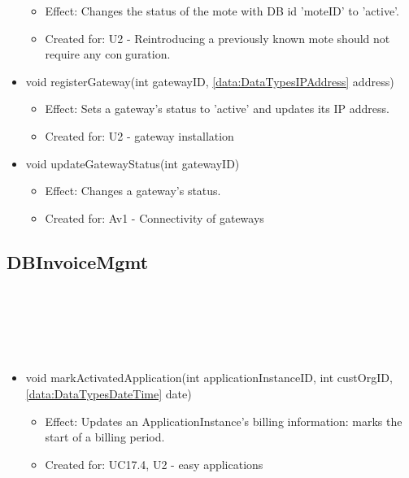 \begin{description}
\begin{itemize}[noitemsep,nolistsep,leftmargin=-.25cm]
\begin{itemize}[noitemsep,nolistsep]
           \item Effect: Changes the status of the mote with DB id 'moteID' to 'active'.
\item Created for: U2 - Reintroducing a previously known mote should not require any conguration.
        \end{itemize}
      \item \textsf{void registerGateway(int gatewayID, \ref{data:DataTypesIPAddress} address)}
        \begin{itemize}[noitemsep,nolistsep]
           \item Effect: Sets a gateway's status to 'active' and updates its IP address.
\item Created for: U2 - gateway installation
        \end{itemize}
      \item \textsf{void updateGatewayStatus(int gatewayID)}
        \begin{itemize}[noitemsep,nolistsep]
           \item Effect: Changes a gateway's status.
\item Created for: Av1 - Connectivity of gateways
        \end{itemize}
    \end{itemize}
    \end{description}

  \subsection{DBInvoiceMgmt}\label{int:OtherDataDatabaseOtherDataDBDBInvoiceMgmt}
    \begin{description}
      \item[Provided by:] \iconcomponent{}~
      \item[Required by:] \iconcomponent{}~
      \item[Operations:] ~
    \begin{itemize}[noitemsep,nolistsep,leftmargin=-.25cm]
      \item \textsf{void markActivatedApplication(int applicationInstanceID, int custOrgID, \ref{data:DataTypesDateTime} date)}
        \begin{itemize}[noitemsep,nolistsep]
           \item Effect: Updates an ApplicationInstance's billing information: marks the start of a billing period.
\item Created for: UC17.4, U2 - easy applications
        \end{itemize}
    \end{itemize}
    \end{description}

